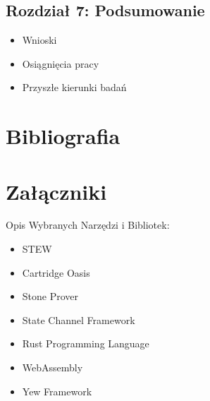 \documentclass{article}
\begin{document}
\subsection{Rozdział 7: Podsumowanie}
\begin{itemize}
    \item Wnioski
    \item Osiągnięcia pracy
    \item Przyszłe kierunki badań
\end{itemize}

\section*{Bibliografia}

\section*{Załączniki}
Opis Wybranych Narzędzi i Bibliotek:
\begin{itemize}
    \item STEW
    \item Cartridge Oasis
    \item Stone Prover
    \item State Channel Framework
    \item Rust Programming Language
    \item WebAssembly
    \item Yew Framework
\end{itemize}
\end{document}
